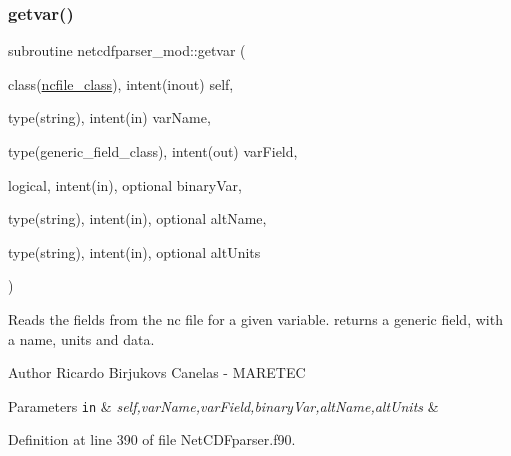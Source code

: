 \subsubsection{\texorpdfstring{getvar()}{getvar()}}
{\footnotesize\ttfamily subroutine netcdfparser\+\_\+mod\+::getvar (\begin{DoxyParamCaption}\item[{class(\mbox{\hyperlink{structnetcdfparser__mod_1_1ncfile__class}{ncfile\+\_\+class}}), intent(inout)}]{self,  }\item[{type(string), intent(in)}]{var\+Name,  }\item[{type(generic\+\_\+field\+\_\+class), intent(out)}]{var\+Field,  }\item[{logical, intent(in), optional}]{binary\+Var,  }\item[{type(string), intent(in), optional}]{alt\+Name,  }\item[{type(string), intent(in), optional}]{alt\+Units }\end{DoxyParamCaption})\hspace{0.3cm}{\ttfamily [private]}}



Reads the fields from the nc file for a given variable. returns a generic field, with a name, units and data. 

\begin{DoxyAuthor}{Author}
Ricardo Birjukovs Canelas -\/ M\+A\+R\+E\+T\+EC 
\end{DoxyAuthor}

\begin{DoxyParams}[1]{Parameters}
\mbox{\tt in}  & {\em self,var\+Name,var\+Field,binary\+Var,alt\+Name,alt\+Units} & \\
\hline
\end{DoxyParams}


Definition at line 390 of file Net\+C\+D\+Fparser.\+f90.


